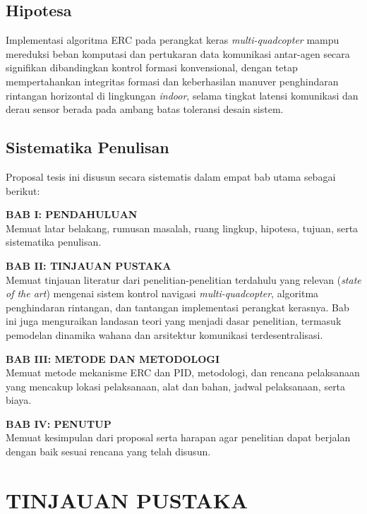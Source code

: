 \documentclass[12pt,a4paper]{report}
\numberwithin{equation}{chapter}
\begin{document}
\section{Hipotesa}
Implementasi algoritma ERC pada perangkat keras \textit{multi-quadcopter} mampu mereduksi beban komputasi dan pertukaran data komunikasi antar-agen secara signifikan dibandingkan kontrol formasi konvensional, dengan tetap mempertahankan integritas formasi dan keberhasilan manuver penghindaran rintangan horizontal di lingkungan \textit{indoor}, selama tingkat latensi komunikasi dan derau sensor berada pada ambang batas toleransi desain sistem.

\section{Sistematika Penulisan}
Proposal tesis ini disusun secara sistematis dalam empat bab utama sebagai berikut:

\noindent\textbf{BAB I: PENDAHULUAN}\\
Memuat latar belakang, rumusan masalah, ruang lingkup, hipotesa, tujuan, serta sistematika penulisan.

\noindent\textbf{BAB II: TINJAUAN PUSTAKA}\\
Memuat tinjauan literatur dari penelitian-penelitian terdahulu yang relevan (\textit{state of the art}) mengenai sistem kontrol navigasi \textit{multi-quadcopter}, algoritma penghindaran rintangan, dan tantangan implementasi perangkat kerasnya. Bab ini juga menguraikan landasan teori yang menjadi dasar penelitian, termasuk pemodelan dinamika wahana dan arsitektur komunikasi terdesentralisasi.

\noindent\textbf{BAB III: METODE DAN METODOLOGI}\\
Memuat metode mekanisme ERC dan PID, metodologi, dan rencana pelaksanaan yang mencakup lokasi pelaksanaan, alat dan bahan, jadwal pelaksanaan, serta biaya.

\noindent\textbf{BAB IV: PENUTUP}\\
Memuat kesimpulan dari proposal serta harapan agar penelitian dapat berjalan dengan baik sesuai rencana yang telah disusun.

\chapter{TINJAUAN PUSTAKA}
\end{document}
